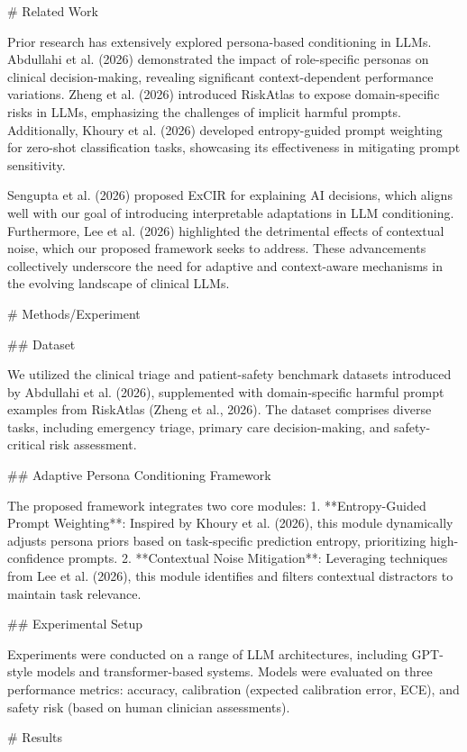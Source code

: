 # Related Work

Prior research has extensively explored persona-based conditioning in LLMs. Abdullahi et al. (2026) demonstrated the impact of role-specific personas on clinical decision-making, revealing significant context-dependent performance variations. Zheng et al. (2026) introduced RiskAtlas to expose domain-specific risks in LLMs, emphasizing the challenges of implicit harmful prompts. Additionally, Khoury et al. (2026) developed entropy-guided prompt weighting for zero-shot classification tasks, showcasing its effectiveness in mitigating prompt sensitivity.

Sengupta et al. (2026) proposed ExCIR for explaining AI decisions, which aligns well with our goal of introducing interpretable adaptations in LLM conditioning. Furthermore, Lee et al. (2026) highlighted the detrimental effects of contextual noise, which our proposed framework seeks to address. These advancements collectively underscore the need for adaptive and context-aware mechanisms in the evolving landscape of clinical LLMs.

# Methods/Experiment

## Dataset

We utilized the clinical triage and patient-safety benchmark datasets introduced by Abdullahi et al. (2026), supplemented with domain-specific harmful prompt examples from RiskAtlas (Zheng et al., 2026). The dataset comprises diverse tasks, including emergency triage, primary care decision-making, and safety-critical risk assessment.

## Adaptive Persona Conditioning Framework

The proposed framework integrates two core modules:
1. **Entropy-Guided Prompt Weighting**: Inspired by Khoury et al. (2026), this module dynamically adjusts persona priors based on task-specific prediction entropy, prioritizing high-confidence prompts.
2. **Contextual Noise Mitigation**: Leveraging techniques from Lee et al. (2026), this module identifies and filters contextual distractors to maintain task relevance.

## Experimental Setup

Experiments were conducted on a range of LLM architectures, including GPT-style models and transformer-based systems. Models were evaluated on three performance metrics: accuracy, calibration (expected calibration error, ECE), and safety risk (based on human clinician assessments).

# Results

